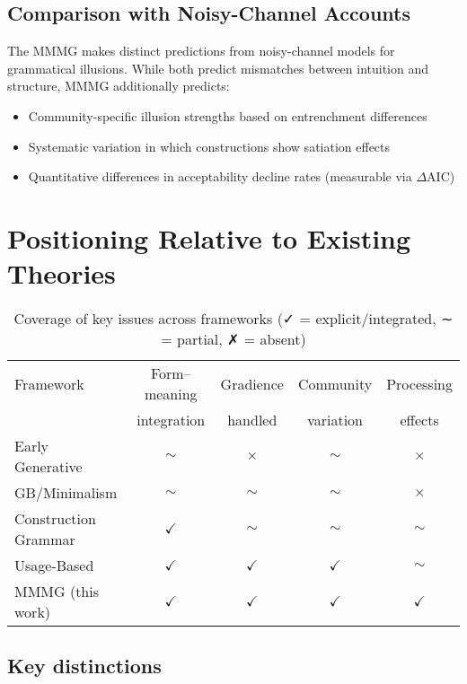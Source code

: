 \documentclass[12pt]{article}
\begin{document}
\subsection{Comparison with Noisy-Channel Accounts}

The MMMG makes distinct predictions from noisy-channel models \parencite{gibson2013} for grammatical illusions. While both predict mismatches between intuition and structure, MMMG additionally predicts:
\begin{itemize}
\item Community-specific illusion strengths based on entrenchment differences
\item Systematic variation in which constructions show satiation effects
\item Quantitative differences in acceptability decline rates (measurable via $\Delta \text{AIC}$)
\end{itemize}

\section{Positioning Relative to Existing Theories}

\begin{table}[h]
\centering
\small
\caption{Coverage of key issues across frameworks (✓ = explicit/integrated, ∼ = partial, ✗ = absent)}
\begin{tabular}{@{}lcccc@{}}
\toprule
Framework & Form–meaning & Gradience & Community & Processing \\
          & integration  & handled   & variation & effects \\
\midrule
Early Generative     & $\sim$ & $\times$ & $\sim$ & $\times$ \\
GB/Minimalism        & $\sim$ & $\sim$   & $\sim$ & $\times$ \\
Construction Grammar & $\checkmark$ & $\sim$ & $\sim$ & $\sim$ \\
Usage-Based          & $\checkmark$ & $\checkmark$ & $\checkmark$ & $\sim$ \\
MMMG (this work)     & $\checkmark$ & $\checkmark$ & $\checkmark$ & $\checkmark$ \\
\bottomrule
\end{tabular}
\end{table}


\subsection{Key distinctions}
\end{document}

